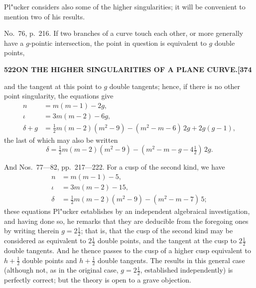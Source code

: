 \documentclass[11pt,a4paper]{article}
\begin{document}
Pl"{u}cker considers also some of the higher singularities; it will be convenient to mention two of his results.

No.~76, p.~216. If two branches of a curve touch each other, or more generally have a $g$-pointic intersection, the point in question is equivalent to $g$ double points,

\newpage
\noindent\textbf{522\hspace{1em}ON THE HIGHER SINGULARITIES OF A PLANE CURVE.\hfill[374}

\vspace{12pt}

\noindent
and the tangent at this point to $g$ double tangents; hence, if there is no other point singularity, the equations give
\begin{align*}
n &= m(m - 1) - 2g,\\
\iota &= 3m(m - 2) - 6g,\\
\delta + g &= \tfrac{1}{2}m(m - 2)(m^{2} - 9) - (m^{2} - m - 6)\,2g + 2g(g - 1),
\end{align*}
the last of which may also be written
\[
\delta = \tfrac{1}{2}m(m - 2)(m^{2} - 9) - (m^{2} - m - g - 4\tfrac{1}{2})\,2g.
\]

And Nos.~77---82, pp.~217---222. For a cusp of the second kind, we have
\begin{align*}
n &= m(m - 1) - 5,\\
\iota &= 3m(m - 2) - 15,\\
\delta &= \tfrac{1}{2}m(m - 2)(m^{2} - 9) - (m^{2} - m - 7)\,5;
\end{align*}
these equations Pl"{u}cker establishes by an independent algebraical investigation, and having done so, he remarks that they are deducible from the foregoing ones by writing therein $g = 2\tfrac{1}{2}$; that is, that the cusp of the second kind may be considered as equivalent to $2\tfrac{1}{2}$ double points, and the tangent at the cusp to $2\tfrac{1}{2}$ double tangents. And he thence passes to the cusp of a higher cusp equivalent to $h + \tfrac{1}{2}$ double points and $h + \tfrac{1}{2}$ double tangents. The results in this general case (although not, as in the original case, $g = 2\tfrac{1}{2}$, established independently) is perfectly correct; but the theory is open to a grave objection.
\end{document}
